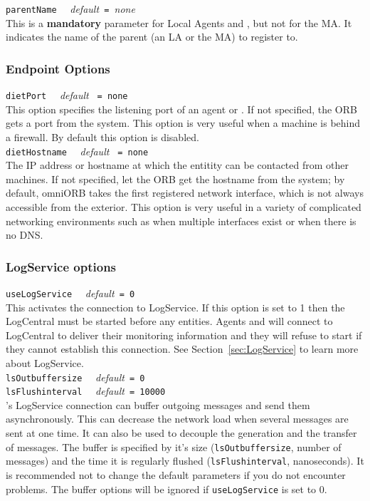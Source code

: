 \noindent
\texttt{parentName} \ \ \emph{default}\texttt{ = }\emph{none}\\ This is a
\textbf{mandatory} parameter for Local Agents and \seds, but not for the MA.
It indicates the name of the parent (an LA or the MA) to register to.

\subsubsection{Endpoint Options}

\noindent
\texttt{dietPort} \ \ \emph{default} \texttt{ = none }\\ This option specifies
the listening port of an agent or \sed. If not specified, the ORB gets a port
from the system. This option is very useful when a machine is behind a
firewall. By default this option is disabled.\\

\noindent
\texttt{dietHostname} \ \ \emph{default} \texttt{ = none }\\ The IP address or
hostname at which the entitity can be contacted from other machines. If not
specified, let the ORB get the hostname from the system; by default, omniORB
takes the first registered network interface, which is not always accessible
from the exterior.  This option is very useful in a variety of complicated
networking environments such as when multiple interfaces exist or when there is
no DNS.

\subsubsection{LogService options}

\noindent
\texttt{useLogService} \ \ \emph{default}\texttt{ = 0}\\ This activates the
connection to LogService. If this option is set to 1 then the LogCentral must
be started before any \diet entities. Agents and \seds will connect to
LogCentral to deliver their monitoring information and they will refuse to
start if they cannot establish this connection. See
Section~\ref{sec:LogService} to learn more about LogService.\\

\noindent
\texttt{lsOutbuffersize} \ \ \emph{default}\texttt{ = 0}\\
\noindent
\texttt{lsFlushinterval} \ \ \emph{default}\texttt{ = 10000}\\ \diet's
LogService connection can buffer outgoing messages and send them
asynchronously. This can decrease the network load when several messages are
sent at one time. It can also be used to decouple the generation and the
transfer of messages. The buffer is specified by it's size
(\texttt{lsOutbuffersize}, number of messages) and the time it is regularly
flushed (\texttt{lsFlushinterval}, nanoseconds). It is recommended not to
change the default parameters if you do not encounter problems. The buffer
options will be ignored if \texttt{useLogService} is set to 0.


